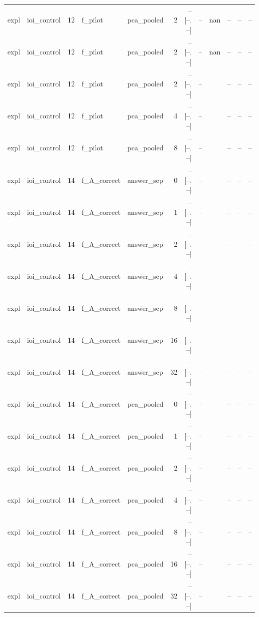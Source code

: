 \begin{tabular}{llrllrrrlrrr}
expl & ioi\_control & 12 & f\_pilot & pca\_pooled & 2 & -- [--, --] & -- & nan & -- & -- & -- \\
expl & ioi\_control & 12 & f\_pilot & pca\_pooled & 2 & -- [--, --] & -- & nan & -- & -- & -- \\
expl & ioi\_control & 12 & f\_pilot & pca\_pooled & 2 & -- [--, --] & -- &  & -- & -- & -- \\
expl & ioi\_control & 12 & f\_pilot & pca\_pooled & 4 & -- [--, --] & -- &  & -- & -- & -- \\
expl & ioi\_control & 12 & f\_pilot & pca\_pooled & 8 & -- [--, --] & -- &  & -- & -- & -- \\
expl & ioi\_control & 14 & f\_A\_correct & answer\_sep & 0 & -- [--, --] & -- &  & -- & -- & -- \\
expl & ioi\_control & 14 & f\_A\_correct & answer\_sep & 1 & -- [--, --] & -- &  & -- & -- & -- \\
expl & ioi\_control & 14 & f\_A\_correct & answer\_sep & 2 & -- [--, --] & -- &  & -- & -- & -- \\
expl & ioi\_control & 14 & f\_A\_correct & answer\_sep & 4 & -- [--, --] & -- &  & -- & -- & -- \\
expl & ioi\_control & 14 & f\_A\_correct & answer\_sep & 8 & -- [--, --] & -- &  & -- & -- & -- \\
expl & ioi\_control & 14 & f\_A\_correct & answer\_sep & 16 & -- [--, --] & -- &  & -- & -- & -- \\
expl & ioi\_control & 14 & f\_A\_correct & answer\_sep & 32 & -- [--, --] & -- &  & -- & -- & -- \\
expl & ioi\_control & 14 & f\_A\_correct & pca\_pooled & 0 & -- [--, --] & -- &  & -- & -- & -- \\
expl & ioi\_control & 14 & f\_A\_correct & pca\_pooled & 1 & -- [--, --] & -- &  & -- & -- & -- \\
expl & ioi\_control & 14 & f\_A\_correct & pca\_pooled & 2 & -- [--, --] & -- &  & -- & -- & -- \\
expl & ioi\_control & 14 & f\_A\_correct & pca\_pooled & 4 & -- [--, --] & -- &  & -- & -- & -- \\
expl & ioi\_control & 14 & f\_A\_correct & pca\_pooled & 8 & -- [--, --] & -- &  & -- & -- & -- \\
expl & ioi\_control & 14 & f\_A\_correct & pca\_pooled & 16 & -- [--, --] & -- &  & -- & -- & -- \\
expl & ioi\_control & 14 & f\_A\_correct & pca\_pooled & 32 & -- [--, --] & -- &  & -- & -- & -- \\

\end{tabular}
